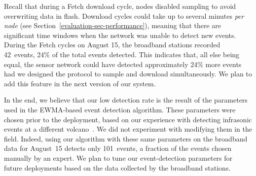 


Recall that during a Fetch download cycle, nodes disabled sampling to avoid
overwriting data in flash. Download cycles could take up to several minutes
{\em per node} (see Section~\ref{evaluation-sec-performance}), meaning that
there are significant time windows when the network was unable to detect new
events.  During the Fetch cycles on August 15, the broadband stations
recorded 42~events, 24\% of the total events detected.  This indicates that,
all else being equal, the sensor network could have detected approximately
24\% more events had we designed the protocol to sample and download
simultaneously. We plan to add this feature in the next version of our
system.

In the end, we believe that our low detection rate is the result of the
parameters used in the EWMA-based event detection algorithm.  These
parameters were chosen prior to the deployment, based on our experience with
detecting infrasonic events at a different volcano~\cite{volcano-ewsn05}. We
did not experiment with modifying them in the field. Indeed, using our
algorithm with these same parameters on the broadband data for August~15
detects only 101~events, a fraction of the events chosen manually by an
expert.  We plan to tune our event-detection parameters for future
deployments based on the data collected by the broadband stations.

